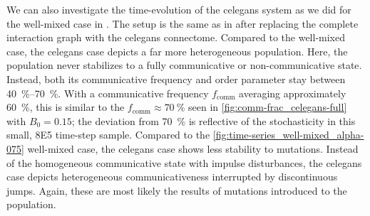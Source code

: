 \documentclass[pdflatex,twocolumn,sn-nature,super]{sn-jnl}
\begin{document}
We can also investigate the time-evolution of the \gls{celegans} system
as we did for the well-mixed case in
.
The setup is the same as in
after replacing the complete interaction graph with the \gls{celegans} connectome.
Compared to the well-mixed case,
the  \gls{celegans} case
depicts a far more heterogeneous population.
Here, the population never stabilizes
to a fully communicative or non-communicative state.
Instead, both its communicative frequency and order parameter
stay between \SIrange{40}{70}{\percent}.
With a communicative frequency $f_{\text{comm}}$ averaging approximately \SI{60}{\percent},
this is similar to the $f_{\text{comm}} \approx \SI{70}{\percent}$ seen
in \cref{fig:comm-frac_celegans-full} with $B_0 = 0.15$;
the deviation from \SI{70}{\percent} is reflective of the
stochasticity in this small, \num{8E5} time-step sample.
Compared to the \cref{fig:time-series_well-mixed_alpha-075} well-mixed case,
the \gls{celegans} case shows less stability to mutations.
Instead of the homogeneous communicative state with impulse disturbances,
the \gls{celegans} case depicts heterogeneous communicativeness
interrupted by discontinuous jumps.
Again, these are most likely the results of mutations introduced
to the population.
\end{document}
